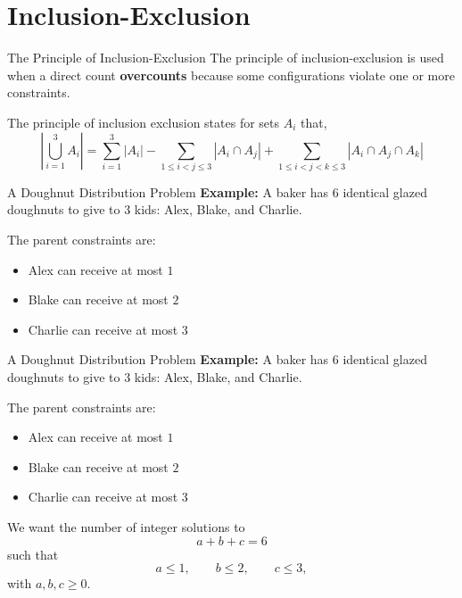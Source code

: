 \section{Inclusion-Exclusion}

\begin{frame}{The Principle of Inclusion-Exclusion}
  The principle of inclusion-exclusion is used when a direct count \textbf{overcounts}
  because some configurations violate one or more constraints.

  \begin{sqt:definition}
    The principle of inclusion exclusion states for sets $A_i$ that,
    \[
    \left|\bigcup_{i=1}^{3} A_i\right|
    =
    \sum_{i=1}^{3} |A_i|
    -
    \sum_{1 \le i < j \le 3} |A_i \cap A_j|
    +
    \sum_{1 \le i < j < k \le 3} |A_i \cap A_j \cap A_k|
    \]

  \end{sqt:definition}



\end{frame}

\begin{frame}{A Doughnut Distribution Problem}
  \textcolor{sqt-question}{
    \textbf{Example:}
    A baker has 6 identical glazed doughnuts to give to 3 kids: Alex, Blake, and Charlie.
  }

  The parent constraints are:
  \begin{itemize}
    \item Alex can receive at most $1$
    \item Blake can receive at most $2$
    \item Charlie can receive at most $3$
  \end{itemize}

\end{frame}

\begin{frame}{A Doughnut Distribution Problem}
  \textcolor{sqt-question}{
    \textbf{Example:}
    A baker has 6 identical glazed doughnuts to give to 3 kids: Alex, Blake, and Charlie.
  }

  The parent constraints are:
  \begin{itemize}
    \item Alex can receive at most $1$
    \item Blake can receive at most $2$
    \item Charlie can receive at most $3$
  \end{itemize}

  \vspace{0.5em}

  We want the number of integer solutions to
  \[
    a+b+c=6
  \]
  such that
  \[
    a \le 1,\qquad b \le 2,\qquad c \le 3,
  \]
  with $a,b,c \ge 0$.
\end{frame}

